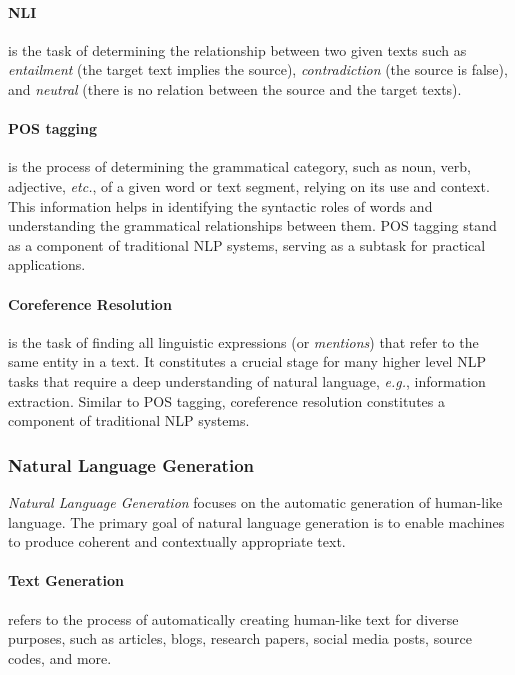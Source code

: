 
\paragraph{\ac{NLI}} is the task of determining the relationship between two given texts such as \textit{entailment} (the target text implies the source), \textit{contradiction} (the source is false), and \textit{neutral} (there is no relation between the source and the target texts).

\paragraph{\ac{POS} tagging} is the process of determining the grammatical category, such as noun, verb, adjective, \textit{etc.}, of a given word or text segment, relying on its use and context. This information helps in identifying the syntactic roles of words and understanding the grammatical relationships between them. \ac{POS} tagging stand as a component of traditional \ac{NLP} systems, serving as a subtask for practical applications.

\paragraph{Coreference Resolution} is the task of finding all linguistic expressions (or \textit {mentions}) that refer to the same entity in a text. It constitutes a crucial stage for many higher level \ac{NLP} tasks that require a deep understanding of natural language, \textit{e.g.}, information extraction. Similar to \ac{POS} tagging, coreference resolution constitutes a component of traditional \ac{NLP} systems.

\subsubsection{Natural Language Generation} 

\textit{Natural Language Generation} focuses on the automatic generation of human-like language. The primary goal of natural language generation is to enable machines to produce coherent and contextually appropriate text.

\paragraph{Text Generation} refers to the process of automatically creating human-like text for diverse purposes, such as articles, blogs, research papers, social media posts, source codes, and more.

